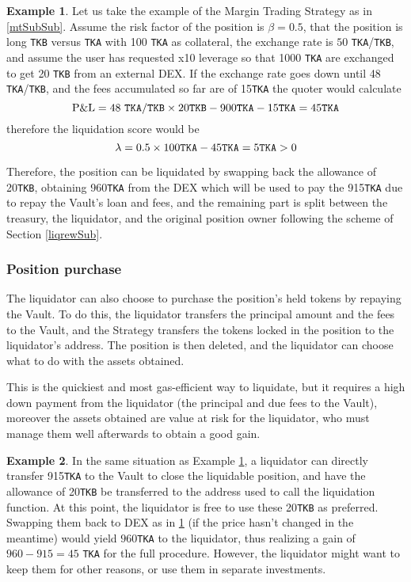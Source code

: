 \documentclass[a4paper,10 pt]{article}
\theoremstyle{definition}
\newtheorem{example}{Example}
\begin{document}
\begin{example}\label{mtLiqEx1}
Let us take the example of the Margin Trading Strategy as in \ref{mtSubSub}. Assume the risk factor of the position is $\beta = 0.5$, that the position is long \verb|TKB| versus \verb|TKA| with 100 \verb|TKA| as collateral, the exchange rate is $50$ \verb|TKA|/\verb|TKB|, and assume the user has requested x10 leverage so that 1000 \verb|TKA| are exchanged to get 20 \verb|TKB| from an external DEX. If the exchange rate goes down until 48 \verb|TKA|/\verb|TKB|, and the fees accumulated so far are of 15\verb|TKA| the quoter would calculate $$\text{P\&L} =  48\ \verb|TKA|/\verb|TKB| \times 20  \verb|TKB| -  900 \verb|TKA| - 15\verb|TKA|= 45  \verb|TKA| $$ therefore the liquidation score would be $$\lambda = 0.5 \times 100\verb|TKA| - 45 \verb|TKA| = 5  \verb|TKA| > 0 $$

Therefore, the position can be liquidated by swapping back the allowance of 20\verb|TKB|, obtaining 960\verb|TKA| from the DEX which will be used to pay the 915\verb|TKA| due to repay the Vault's loan and fees, and the remaining part is split between the treasury, the liquidator, and the original position owner following the scheme of Section \ref{liqrewSub}.
\end{example}

\subsubsection{Position purchase}\label{ppSubSub}
The liquidator can also choose to purchase the position's held tokens by repaying the Vault. To do this, the liquidator transfers the principal amount and the fees to the Vault, and the Strategy transfers the tokens locked in the position to the liquidator's address. The position is then deleted, and the liquidator can choose what to do with the assets obtained.

This is the quickiest and most gas-efficient way to liquidate, but it requires a high down payment from the liquidator (the principal and due fees to the Vault), moreover the assets obtained are value at risk for the liquidator, who must manage them well afterwards to obtain a good gain.

\begin{example}\label{mtLiqEx2}
In the same situation as Example \ref{mtLiqEx1}, a liquidator can directly transfer 915\verb|TKA| to the Vault to close the liquidable position, and have the allowance of 20\verb|TKB| be transferred to the address used to call the liquidation function. At this point, the liquidator is free to use these 20\verb|TKB| as preferred. Swapping them back to DEX as in \ref{mtLiqEx1} (if the price hasn't changed in the meantime) would yield $960$\verb|TKA| to the liquidator, thus realizing a gain of $960-915 = 45$ \verb|TKA| for the full procedure. However, the liquidator might want to keep them for other reasons, or use them in separate investments. 
\end{example}
\end{document}
